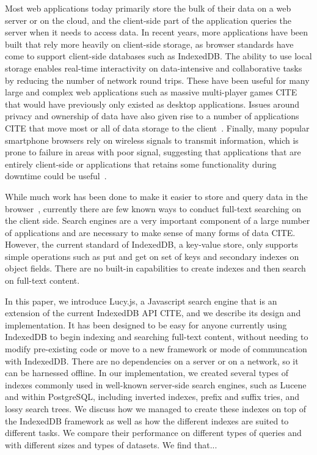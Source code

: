 \documentclass{vldb}
\begin{document}
Most web applications today primarily store the bulk of their data on a web server or on the cloud, and the client-side part of the application queries the server when it needs to access data.
In recent years, more applications have been built that rely more heavily on client-side storage, as browser standards have come to support client-side databases such as IndexedDB. 
The ability to use local storage enables real-time interactivity on data-intensive and collaborative tasks by reducing the number of network round trips.
These have been useful for many large and complex web applications such as massive multi-player games CITE that would have previously only existed as desktop applications.
Issues around privacy and ownership of data have also given rise to a number of applications CITE that move most or all of data storage to the client~\cite{bilenko2011predictive}. 
Finally, many popular smartphone browsers rely on wireless signals to transmit information, which is prone to failure in areas with poor signal, suggesting that applications that are entirely client-side or applications that retains some functionality during downtime could be useful~\cite{balasubramanian2012findall}.

While much work has been done to make it easier to store and query data in the browser~\cite{benson2010sync}, currently there are few known ways to conduct full-text searching on the client side. Search engines are a very important component of a large number of applications and are necessary to make sense of many forms of data CITE. However, the current standard of IndexedDB, a key-value store, only supports simple operations such as put and get on set of keys and secondary indexes on object fields. There are no built-in capabilities to create indexes and then search on full-text content. 

In this paper, we introduce Lucy.js, a Javascript search engine that is an extension of the current IndexedDB API CITE, and we describe its design and implementation. It has been designed to be easy for anyone currently using IndexedDB to begin indexing and searching full-text content, without needing to modify pre-existing code or move to a new framework or mode of communcation with IndexedDB. There are no dependencies on a server or on a network, so it can be harnessed offline. In our implementation, we created several types of indexes commonly used in well-known server-side search engines, such as Lucene and within PostgreSQL, including inverted indexes, prefix and suffix tries, and lossy search trees. We discuss how we managed to create these indexes on top of the IndexedDB framework as well as how the different indexes are suited to different tasks. We compare their performance on different types of queries and with different sizes and types of datasets. We find that...
\end{document}
